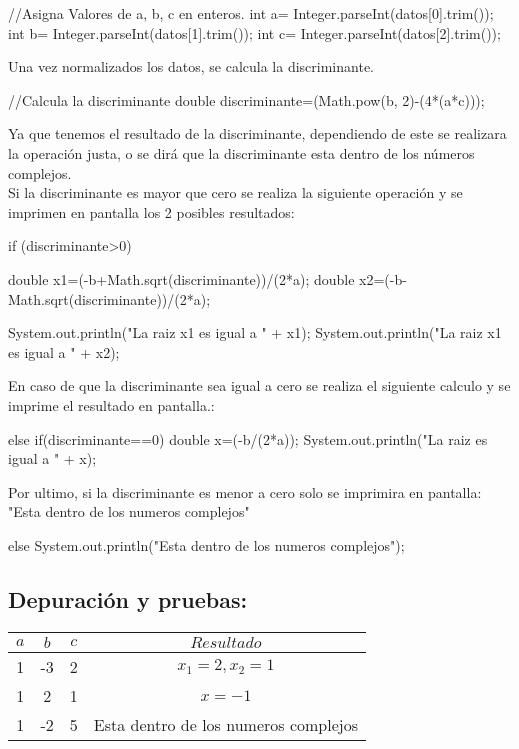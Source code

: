\begin{javaCode}
    //Asigna Valores de a, b, c en enteros.
        int a= Integer.parseInt(datos[0].trim());
        int b= Integer.parseInt(datos[1].trim());
        int c= Integer.parseInt(datos[2].trim());
        
\end{javaCode}
Una vez normalizados los datos, se calcula la discriminante.
\begin{javaCode}
    //Calcula la discriminante
    double discriminante=(Math.pow(b, 2)-(4*(a*c)));
\end{javaCode}

Ya que tenemos el resultado de la discriminante, dependiendo de este se realizara la operación justa, o se dirá que la discriminante esta dentro de los números complejos.\\
Si la discriminante es mayor que cero se realiza la siguiente operación y se imprimen en pantalla los 2 posibles resultados:
\begin{javaCode}
    if (discriminante>0) {
        double x1=(-b+Math.sqrt(discriminante))/(2*a);
        double x2=(-b-Math.sqrt(discriminante))/(2*a);

        System.out.println("La raiz x1 es igual a " + x1);
        System.out.println("La raiz x1 es igual a " + x2);
            
        }
\end{javaCode}
En caso de que la discriminante sea igual a cero se realiza el siguiente calculo y se imprime el resultado en pantalla.:
\begin{javaCode}
    else if(discriminante==0){
            double x=(-b/(2*a));
            System.out.println("La raiz es igual a " + x);
        }
\end{javaCode}
Por ultimo, si la discriminante es menor a cero solo se imprimira en pantalla:\\"Esta dentro de los numeros complejos"
\begin{javaCode}
    else{
            System.out.println("Esta dentro de los numeros complejos");
        }
\end{javaCode}

\subsection{\textbf{Depuración y pruebas:}}
\begin{center}
    \begin{tabular}{|c|c|c|c|}
    \hline
    \textbf{\(a\)} & \textbf{\(b\)} & \textbf{\(c\)} & \textbf{\(Resultado\)} \\
    \hline
    1 & -3 & 2 & \(x_1 = 2, x_2 = 1\) \\
    \hline
    1 & 2 & 1 & \(x = -1\) \\
    \hline
    1 & -2 & 5 & Esta dentro de los numeros complejos\\
    \hline
    \end{tabular}
    \end{center}
    
    \clearpage